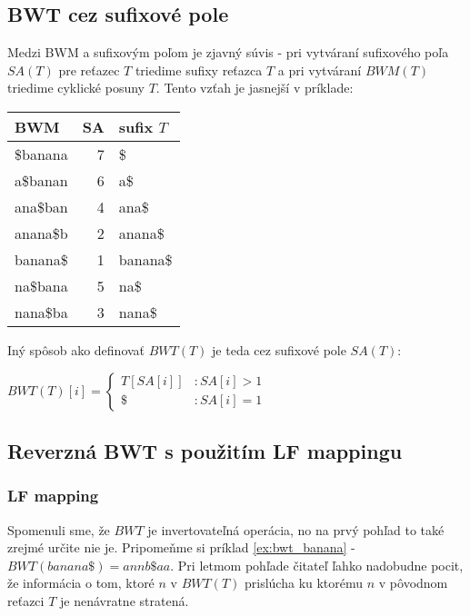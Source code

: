     \subsection{BWT cez sufixové pole}
    Medzi BWM a sufixovým poľom je zjavný súvis - pri vytváraní sufixového poľa
    $SA(T)$ pre reťazec $T$ triedime sufixy reťazca $T$ a pri vytváraní $BWM(T)$
    triedime cyklické posuny $T$. Tento vzťah je jasnejší v príklade:
    
    \bigskip
    
    \begin{example}
        \begin{tabular}{ | l  | r | l | }
            \hline
            \textbf{BWM} & \textbf{SA} & \textbf{sufix $T$} \\ \hline 
            \$banana     & 7           & \$                 \\ \hline
            a\$banan     & 6           & a\$                \\ \hline
            ana\$ban     & 4           & ana\$              \\ \hline
            anana\$b     & 2           & anana\$            \\ \hline
            banana\$     & 1           & banana\$           \\ \hline
            na\$bana     & 5           & na\$               \\ \hline
            nana\$ba     & 3           & nana\$             \\ \hline
        \end{tabular}
    \end{example}
    
    \bigskip
    
    Iný spôsob ako definovať $BWT(T)$ je teda cez sufixové pole $SA(T)$:
    
    \bigskip
    
    $
        BWT(T)[i] = \begin{cases}
                        T[SA[i]] & : SA[i] > 1 \\ 
                        \$       & : SA[i] = 1
                    \end{cases}
    $                    
     
    \subsection{Reverzná BWT s použitím LF mappingu}
    \subsubsection{LF mapping}
    Spomenuli sme, že $BWT$ je invertovateľná operácia, no na prvý pohľad to také zrejmé určite nie je. Pripomeňme si príklad \ref{ex:bwt_banana} - $BWT(banana\$) = annb\$aa$. Pri letmom pohľade čitateľ ľahko nadobudne pocit, že informácia o tom, ktoré $n$ v $BWT(T)$ prislúcha ku ktorému $n$ v pôvodnom reťazci $T$ je nenávratne stratená.
    
